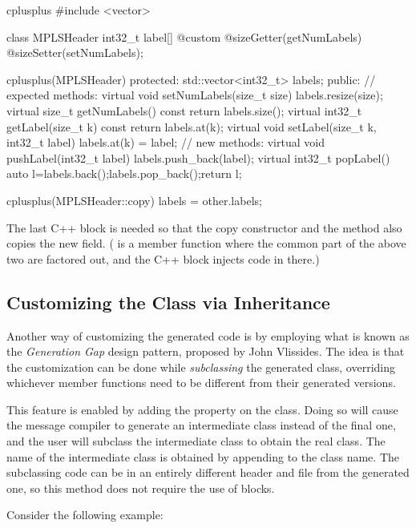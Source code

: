 \begin{msg}
cplusplus {{
#include <vector>
}}

class MPLSHeader
{
    int32_t label[] @custom @sizeGetter(getNumLabels) @sizeSetter(setNumLabels);
}

cplusplus(MPLSHeader) {{
  protected:
    std::vector<int32_t> labels;
  public:
    // expected methods:
    virtual void setNumLabels(size_t size) {labels.resize(size);}
    virtual size_t getNumLabels() const {return labels.size();}
    virtual int32_t getLabel(size_t k) const {return labels.at(k);}
    virtual void setLabel(size_t k, int32_t label) {labels.at(k) = label;}
    // new methods:
    virtual void pushLabel(int32_t label) {labels.push_back(label);}
    virtual int32_t popLabel() {auto l=labels.back();labels.pop_back();return l;}
}}

cplusplus(MPLSHeader::copy) {{
    labels = other.labels;
}}
\end{msg}

The last C++ block is needed so that the copy constructor and the
 method also copies the new field. ( is a member
function where the common part of the above two are factored out, and the C++
block injects code in there.)


\subsection{Customizing the Class via Inheritance}
\label{sec:msg-defs:customizing-via-inheritance}

Another way of customizing the generated code is by employing what is known as
the \textit{Generation Gap} design pattern, proposed by John Vlissides. The idea
is that the customization can be done while \textit{subclassing} the generated
class, overriding whichever member functions need to be different from their
generated versions.

This feature is enabled by adding the  property on the class.
Doing so will cause the message compiler to generate an intermediate class
instead of the final one, and the user will subclass the intermediate class to
obtain the real class. The name of the intermediate class is obtained by
appending  to the class name. The subclassing code can be in an
entirely different header and  file from the generated one, so this
method does not require the use of  blocks.

Consider the following example:

